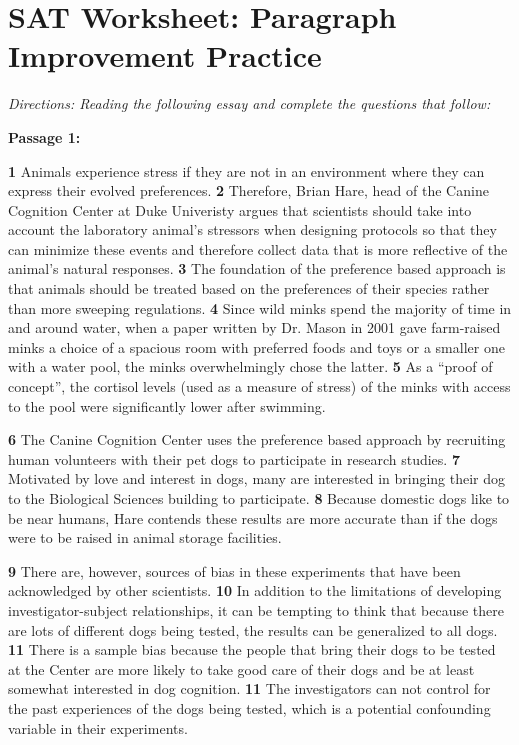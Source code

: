 \section{SAT Worksheet: Paragraph Improvement Practice}

\textit{Directions: Reading the following essay and complete the questions that follow:}

\bigskip
\textbf{Passage 1:}

\bigskip
\indent \textbf{1} Animals experience stress if they are not in an environment where they can express their evolved preferences. \textbf{2} Therefore, Brian Hare, head of the Canine Cognition Center at Duke Univeristy argues that scientists should take into account the laboratory animal’s stressors when designing protocols so that they can minimize these events and therefore collect data that is more reflective of the animal’s natural responses. \textbf{3} The foundation of the preference based approach is that animals should be treated based on the preferences of their species rather than more sweeping regulations. \textbf{4} Since wild minks spend the majority of time in and around water, when a paper written by Dr. Mason in 2001 gave farm-raised minks a choice of a spacious room with preferred foods and toys or a smaller one with a water pool, the minks overwhelmingly chose the latter. \textbf{5} As a ``proof of concept'', the cortisol levels (used as a measure of stress) of the minks with access to the pool were significantly lower after swimming.

\indent \textbf{6} The Canine Cognition Center uses the preference based approach by recruiting human volunteers with their pet dogs to participate in research studies. \textbf{7} Motivated by love and interest in dogs, many are interested in bringing their dog to the Biological Sciences building to participate. \textbf{8} Because domestic dogs like to be near humans, Hare contends these results are more accurate than if the dogs were to be raised in animal storage facilities. 

\indent \textbf{9} There are, however, sources of bias in these experiments that have been acknowledged by other scientists. \textbf{10} In addition to the limitations of developing investigator-subject relationships, it can be tempting to think that because there are lots of different dogs being tested, the results can be generalized to all dogs. \textbf{11} There is a sample bias because the people that bring their dogs to be tested at the Center are more likely to take good care of their dogs and be at least somewhat interested in dog cognition. \textbf{11} The investigators can not control for the past experiences of the dogs being tested, which is a potential confounding variable in their experiments. 

